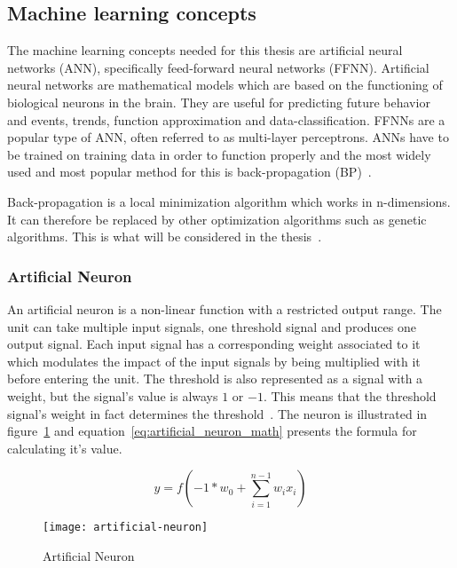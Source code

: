 \subsection{Machine learning concepts}

The machine learning concepts needed for this thesis are artificial neural networks (ANN), specifically feed-forward neural networks (FFNN). Artificial neural networks are mathematical models which are based on the functioning of biological neurons in the brain. They are useful for predicting future behavior and events, trends, function approximation and data-classification. FFNNs are a popular type of ANN, often referred to as multi-layer perceptrons.  ANNs have to be trained on training data in order to function properly and the most widely used and most popular method for this is back-propagation (BP)~\cite{gardner1998artificial}.

Back-propagation is a local minimization algorithm which works in n-dimensions. It can therefore be replaced by other optimization algorithms such as genetic algorithms. This is what will be considered in the thesis~\cite{gardner1998artificial}.

\subsubsection{Artificial Neuron}

An artificial neuron is a non-linear function with a restricted output range. The unit can take multiple input signals, one threshold signal and produces one output signal. Each input signal has a corresponding weight associated to it which modulates the impact of the input signals by being multiplied with it before entering the unit. The threshold is also represented as a signal with a weight, but the signal's value is always $1$ or $-1$. This means that the threshold signal's weight in fact determines the threshold~\cite{koehn1994combining}. The neuron is illustrated in figure~\ref{figure:artificial_neuron} and equation~\ref{eq:artificial_neuron_math} presents the formula for calculating it's value.

\begin{equation} \label{eq:artificial_neuron_math}
  y = f(-1*w_0+\sum_{i=1}^{n-1}{w_ix_i})
\end{equation}

\begin{figure}[H]
  \centering
    \texttt{[image: artificial-neuron]}
    \caption{Artificial Neuron}
    \label{figure:artificial_neuron}
\end{figure}

